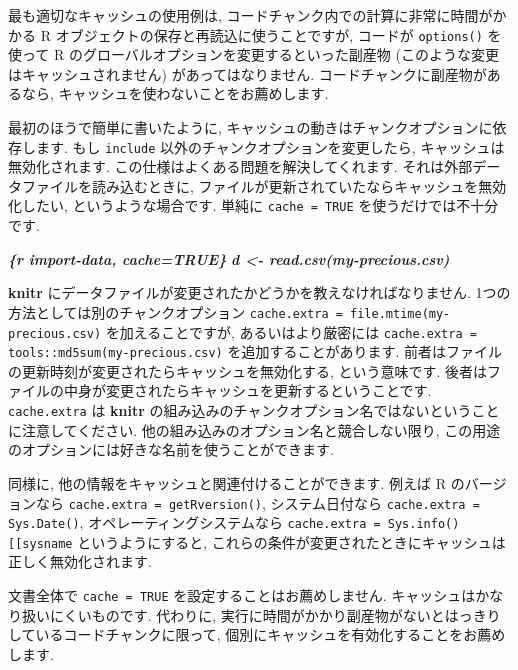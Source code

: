 \documentclass[
  11pt,
  lualatex,
  ja=standard]{bxjsreport}
\newenvironment{Shaded}{\begin{snugshade}}{\end{snugshade}}
\newcommand{\InformationTok}[1]{\textcolor[rgb]{0.56,0.35,0.01}{\textbf{\textit{#1}}}}
\begin{document}
最も適切なキャッシュの使用例は, コードチャンク内での計算に非常に時間がかかる R オブジェクトの保存と再読込に使うことですが, コードが \texttt{options()} を使って R のグローバルオプションを変更するといった副産物 (このような変更はキャッシュされません) があってはなりません. コードチャンクに副産物があるなら, キャッシュを使わないことをお薦めします.

最初のほうで簡単に書いたように, キャッシュの動きはチャンクオプションに依存します. もし \texttt{include} 以外のチャンクオプションを変更したら, キャッシュは無効化されます. この仕様はよくある問題を解決してくれます. それは外部データファイルを読み込むときに, ファイルが更新されていたならキャッシュを無効化したい, というような場合です. 単純に \texttt{cache = TRUE} を使うだけでは不十分です.

\begin{Shaded}
\begin{Highlighting}[]
\InformationTok{\textasciigrave{}\textasciigrave{}\textasciigrave{}\{r import{-}data, cache=TRUE\}}
\InformationTok{d \textless{}{-} read.csv(\textquotesingle{}my{-}precious.csv\textquotesingle{})}
\InformationTok{\textasciigrave{}\textasciigrave{}\textasciigrave{}}
\end{Highlighting}
\end{Shaded}

\textbf{knitr} にデータファイルが変更されたかどうかを教えなければなりません. 1つの方法としては別のチャンクオプション \texttt{cache.extra = file.mtime(\textquotesingle{}my-precious.csv\textquotesingle{})} を加えることですが, あるいはより厳密には \texttt{cache.extra = tools::md5sum(\textquotesingle{}my-precious.csv\textquotesingle{})} を追加することがあります. 前者はファイルの更新時刻が変更されたらキャッシュを無効化する, という意味です. 後者はファイルの中身が変更されたらキャッシュを更新するということです. \texttt{cache.extra} は \textbf{knitr} の組み込みのチャンクオプション名ではないということに注意してください. 他の組み込みのオプション名と競合しない限り, この用途のオプションには好きな名前を使うことができます.

同様に, 他の情報をキャッシュと関連付けることができます. 例えば R のバージョンなら \texttt{cache.extra = getRversion()}, システム日付なら \texttt{cache.extra = Sys.Date()}, オペレーティングシステムなら \texttt{cache.extra = Sys.info(){[}{[}\textquotesingle{}sysname\textquotesingle{}{]}{]}} というようにすると, これらの条件が変更されたときにキャッシュは正しく無効化されます.

文書全体で \texttt{cache = TRUE} を設定することはお薦めしません. キャッシュはかなり扱いにくいものです. 代わりに, 実行に時間がかかり副産物がないとはっきりしているコードチャンクに限って, 個別にキャッシュを有効化することをお薦めします.
\end{document}
